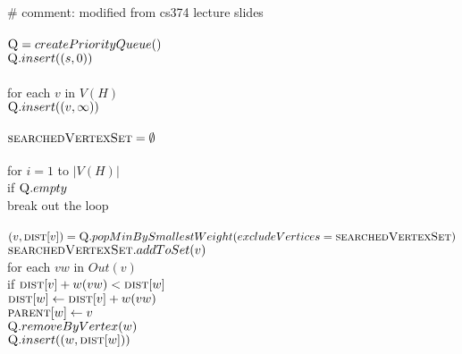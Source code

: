 \documentclass[11pt]{article}
\begin{document}
\begin{itemize}
\begin{algo}
	\+
\\[0.5ex]
\\		\# comment: modified from cs374 lecture slides
\\
\\		$\textsc{Q} = createPriorityQueue()$
\\		$\textsc{Q}.insert((s,0))$
\\		
\\		for each $v$ in $V(H)$\+
\\			$\textsc{Q}.insert((v,\infty))$\-
\\
\\		$\textsc{searchedVertexSet} = \emptyset$
\\		
\\		for $i = 1$ to $|V(H)|$\+
\\			if $\textsc{Q}.empty$\+
\\				break out the loop\-
\\			
\\			$(v, \textsc{dist}[v]) = \textsc{Q}.popMinBySmallestWeight(excludeVertices=\textsc{searchedVertexSet})$
\\			$\textsc{searchedVertexSet}.addToSet(v)$
\\			for each $vw$ in $Out(v)$\+
\\				if $\textsc{dist}[v] + w(vw) < \textsc{dist}[w]$\+
\\					$\textsc{dist}[w] \gets \textsc{dist}[v] + w(vw)$
\\					$\textsc{parent}[w] \gets v$
\\					$\textsc{Q}.removeByVertex(w)$
\\					$\textsc{Q}.insert((w,\textsc{dist}[w]))$\- \- \-
\\[0.5ex]
\end{algo}


\end{itemize}
\end{document}
